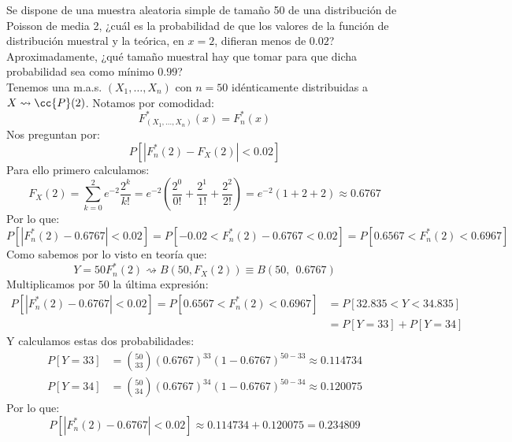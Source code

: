 \begin{ejercicio}
    Se dispone de una muestra aleatoria simple de tamaño 50 de una distribución de Poisson de media 2, ¿cuál es la probabilidad de que los valores de la función de distribución muestral y la teórica, en $x=2$, difieran menos de $0.02$? Aproximadamente, ¿qué tamaño muestral hay que tomar para que dicha probabilidad sea como mínimo $0.99$?\\

    \noindent
    Tenemos una m.a.s. $(X_1, \ldots, X_n)$ con $n=50$ idénticamente distribuidas a $X\rightsquigarrow \cc{P}(2)$. Notamos por comodidad:
    \begin{equation*}
        F_{(X_1, \ldots, X_n)}^\ast(x) = F_n^\ast(x)
    \end{equation*}
    Nos preguntan por:
    \begin{equation*}
        P[|F_n^\ast(2) - F_X(2)| < 0.02]
    \end{equation*}
    Para ello primero calculamos:
    \begin{equation*}
        F_X(2) = \sum_{k=0}^{2} e^{-2}\dfrac{2^k}{k!} =  e^{-2}\left(\dfrac{2^0}{0!} + \dfrac{2^1}{1!} + \dfrac{2^2}{2!}\right) = e^{-2} (1+2+2) \approx 0.6767
    \end{equation*}
    Por lo que:
    \begin{equation*}
        P[|F_n^\ast(2) - 0.6767| < 0.02] = P[-0.02 < F_n^\ast(2) - 0.6767 < 0.02] = P[0.6567 < F_n^\ast(2) < 0.6967]
    \end{equation*}
    Como sabemos por lo visto en teoría que:
    \begin{equation*}
        Y = 50F_n^\ast(2) \rightsquigarrow B(50, F_X(2)) \equiv B(50,\ \ 0.6767)
    \end{equation*}
    Multiplicamos por $50$ la última expresión:
    \begin{align*}
        P[|F_n^\ast(2) - 0.6767| < 0.02] = P[0.6567 < F_n^\ast(2) < 0.6967] &= P[32.835 < Y< 34.835] \\
                                         &= P[Y = 33] + P[Y=34]
    \end{align*}
    Y calculamos estas dos probabilidades:
    \begin{align*}
        P[Y=33] &= \binom{50}{33} {(0.6767)}^{33} {(1-0.6767)}^{50-33} \approx 0.114734\\
        P[Y=34] &= \binom{50}{34} {(0.6767)}^{34} {(1-0.6767)}^{50-34} \approx 0.120075
    \end{align*}
    Por lo que:
    \begin{equation*}
        P[|F_n^\ast(2) - 0.6767| < 0.02] \approx 0.114734 + 0.120075 = 0.234809
    \end{equation*}


\end{ejercicio}
